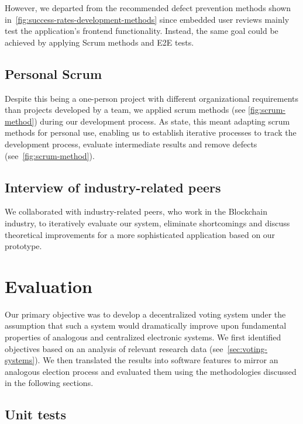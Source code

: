 However, we departed from the recommended defect prevention methods shown in~\cref{fig:success-rates-development-methods} since embedded user reviews mainly test the application’s frontend functionality.
Instead, the same goal could be achieved by applying Scrum methods and \gls{E2E} tests.

\subsection{Personal Scrum}\label{subsec:personal-scrum}

Despite this being a one-person project with different organizational requirements than projects developed by a team, we applied scrum methods (see \cref{fig:scrum-method}) during our development process.
As \textcites{andrews_scrum_2017}{pahuja_scrum_2015} state, this meant adapting scrum methods for personal use, enabling us to establish iterative processes to track the development process, evaluate intermediate results and remove defects (see~\cref{fig:scrum-method}).

\subsection{Interview of industry-related peers}\label{subsec:interview-of-industry-member}

We collaborated with industry-related peers, who work in the \gls{Blockchain} industry, to iteratively evaluate our system, eliminate shortcomings and discuss theoretical improvements for a more sophisticated application based on our prototype.

\section{Evaluation}\label{sec:evaluation}

Our primary objective was to develop a decentralized voting system under the assumption that such a system would dramatically improve upon fundamental properties of analogous and centralized electronic systems.
We first identified objectives based on an analysis of relevant research data (see~\cref{sec:voting-systems}).
We then translated the results into software features to mirror an analogous election process and evaluated them using the methodologies discussed in the following sections.

\subsection{Unit tests}\label{subsec:unit-tests}

